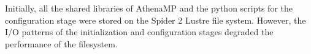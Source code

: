 Initially, all the shared libraries of AthenaMP and the python scripts for the
configuration stage were stored on the Spider 2 Lustre file system. However, the
I/O patterns of the initialization and configuration stages degraded the
performance of the filesystem.
%
%
%
